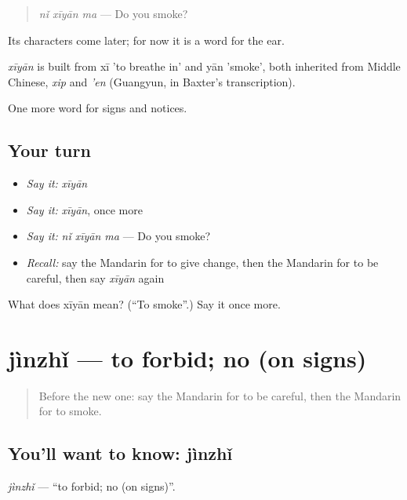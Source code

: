 \begin{quote}
\emph{nǐ xīyān ma} — Do you smoke?
\end{quote}

Its characters come later; for now it is a word for the ear.

\begin{cousinweb}
\emph{xīyān} is built from xī 'to breathe in' and yān 'smoke', both inherited from Middle Chinese, \emph{xip} and \emph{'en} (Guangyun, in Baxter's transcription).
\end{cousinweb}

\begin{grammarlens}[title={What you've built}]
One more word for signs and notices.
\end{grammarlens}

\subsection*{Your turn}
\begin{itemize}
\raggedright
  \item \emph{Say it:} \emph{xīyān}
  \item \emph{Say it:} \emph{xīyān}, once more
  \item \emph{Say it:} \emph{nǐ xīyān ma} — Do you smoke?
  \item \emph{Recall:} say the Mandarin for to give change, then the Mandarin for to be careful, then say \emph{xīyān} again
\end{itemize}

\begin{tcolorbox}[breakable,colback=teal!4,colframe=teal!35!black,title={Before you move on}]
What does xīyān mean? (\textquotedblleft{}To smoke\textquotedblright{}.) Say it once more.
\end{tcolorbox}
\section[jìnzhǐ]{jìnzhǐ — to forbid; no (on signs)}

\label{lesson:ZH-C115-jinzhi}



\begin{quote}
Before the new one: say the Mandarin for to be careful, then the Mandarin for to smoke.
\end{quote}

\subsection*{You'll want to know: jìnzhǐ}
\emph{jìnzhǐ} — \textquotedblleft{}to forbid; no (on signs)\textquotedblright{}.

